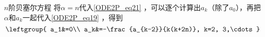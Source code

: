 \begin{example}{$n$阶贝塞尔方程}
将$\alpha=n$代入\autoref{ODE2P_eq21} ，可以逐个计算出$a_k$（除了$a_0$），再把$\alpha$和$a_k$一起代入\autoref{ODE2P_eq19} ，得到
\begin{equation}
\leftgroup{
    a_1&=0\\
    a_k&=-\frac{a_{k-2}}{k(k+2n)}, k=2, 3,\cdots
}
\end{equation}





\end{example}
















